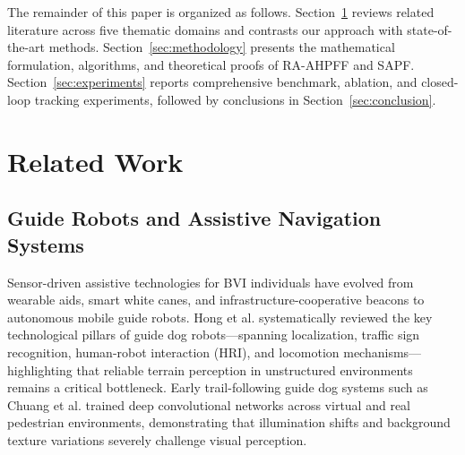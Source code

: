 \documentclass[11pt, a4paper]{article}
\begin{document}
The remainder of this paper is organized as follows. Section~\ref{sec:related_work} reviews related literature across five thematic domains and contrasts our approach with state-of-the-art methods. Section~\ref{sec:methodology} presents the mathematical formulation, algorithms, and theoretical proofs of RA-AHPFF and SAPF. Section~\ref{sec:experiments} reports comprehensive benchmark, ablation, and closed-loop tracking experiments, followed by conclusions in Section~\ref{sec:conclusion}.

\section{Related Work}
\label{sec:related_work}

\subsection{Guide Robots and Assistive Navigation Systems}
\label{subsec:rw_guide}
Sensor-driven assistive technologies for BVI individuals have evolved from wearable aids, smart white canes, and infrastructure-cooperative beacons \cite{patel2024review, wang2025design, wang2026design, ye2016co, zhong2020virtual, lu2021assistive} to autonomous mobile guide robots. Hong et al. \cite{hong2022development} systematically reviewed the key technological pillars of guide dog robots—spanning localization, traffic sign recognition, human-robot interaction (HRI), and locomotion mechanisms—highlighting that reliable terrain perception in unstructured environments remains a critical bottleneck. Early trail-following guide dog systems such as Chuang et al. \cite{chuang2018deep} trained deep convolutional networks across virtual and real pedestrian environments, demonstrating that illumination shifts and background texture variations severely challenge visual perception.
\end{document}
